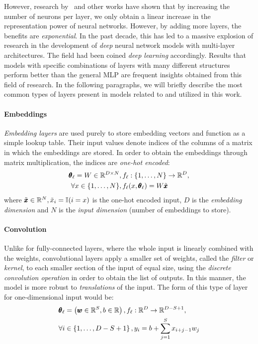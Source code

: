 However, research by~\cite{telgarsky_representation_2015, telgarsky_benefits_2016} and other works have shown that by increasing the number of neurons per layer, we only obtain a linear increase in the representation power of neural networks. However, by adding more layers, the benefits are \emph{exponential}. In the past decade, this has led to a massive explosion of research in the development of \emph{deep} neural network models with multi-layer architectures. The field had been coined \emph{deep learning} accordingly. Results that models with specific combinations of layers with many different structures perform better than the general MLP are frequent insights obtained from this field of research. In the following paragraphs, we will briefly describe the most common types of layers present in models related to and utilized in this work.

\paragraph{Embeddings} \emph{Embedding layers} are used purely to store embedding vectors and function as a simple lookup table. Their input values denote indices of the columns of a matrix in which the embeddings are stored. In order to obtain the embeddings through matrix multiplication, the indices are \emph{one-hot encoded}: 
\begin{align}
    \begin{split}
        \pmb{\theta}_{\ell} = W \in \mathbb{R}^{D \times N}&, f_{\ell}: \mathopen{}\left\{1,\dots,N\right\} \to \mathbb{R}^D, \\
        \forall x \in \mathopen{}\left\{1,\dots,N\right\}&, f_{\ell}\mathopen{}\left(x, \pmb{\theta}_{\ell}\right) = W \tilde{\pmb{x}}
    \end{split}
\end{align}
where $\tilde{\pmb{x}} \in \mathbb{R}^N, \tilde{x}_i = \mathbb{I}\mathopen{}\left(i = x\right)$ is the one-hot encoded input, $D$ is the \emph{embedding dimension} and $N$ is the \emph{input dimension} (number of embeddings to store).

\paragraph{Convolution} Unlike for fully-connected layers, where the whole input is linearly combined with the weights, convolutional layers apply a smaller set of weights, called the \emph{filter} or \emph{kernel}, to each smaller section of the input of equal size, using the \emph{discrete convolution operation} in order to obtain the list of outputs. In this manner, the model is more robust to \emph{translations} of the input. The form of this type of layer for one-dimensional input would be: 
\begin{align}
\begin{split}
\pmb{\theta}_{\ell} &= \mathopen{}\left(\pmb{w} \in \mathbb{R}^{S}, b \in \mathbb{R}\right), f_{\ell}: \mathbb{R}^{D} \to \mathbb{R}^{D-S+1}, \\
\forall i &\in \mathopen{}\left\{1,\dots,D-S+1\right\}, y_i = b + \sum_{j=1}^{S}{x_{i+j-1}w_j} 
\end{split}
\end{align}

